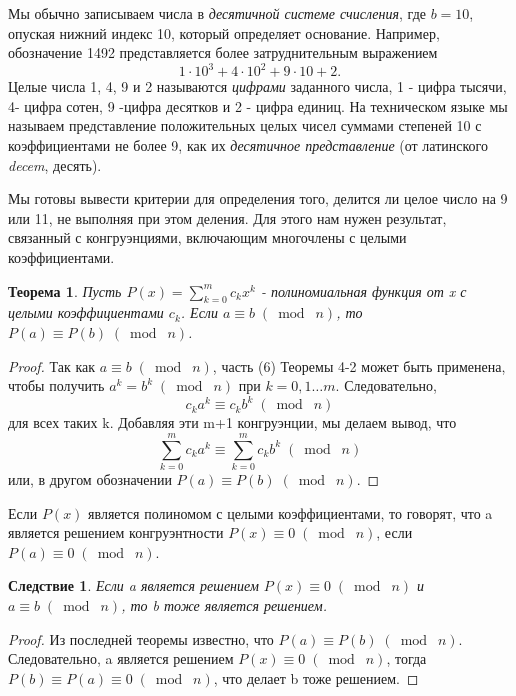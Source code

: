 \documentclass[11pt]{article}
\newtheorem{theorem}{Теорема}
\newtheorem{corollary}{Следствие}
\begin{document}
 Мы обычно записываем числа в {\it десятичной системе счисления}, где $ b=10 $, опуская нижний индекс 10, который определяет основание. Например, обозначение 1492 представляется более затруднительным выражением $$1\cdot10^{3}+4\cdot10^{2}+9\cdot10+2.  $$ Целые числа  1, 4, 9 и 2 называются {\it цифрами} заданного числа, 1 - цифра тысячи, 4- цифра сотен, 9 -цифра десятков и 2 - цифра единиц. На техническом языке мы называем представление положительных целых чисел суммами степеней 10 с коэффициентами не более 9, как их {\it десятичное представление} (от латинского {\it decem}, десять).
 
 Мы готовы вывести критерии для определения того, делится ли целое число на 9 или 11, не выполняя при этом деления. Для этого нам нужен результат, связанный с конгруэнциями, включающим многочлены с целыми коэффициентами.

\begin{theorem}
Пусть $P(x)=\sum_{k=0}^mc_{k}x^{k} $ - полиномиальная функция от  x  с целыми коэффициентами $ c_{k} $. Если  $a \equiv b \;(\bmod\; n)$, то $P(a) \equiv P(b) \;(\bmod\; n)$.
\end{theorem}

\begin{proof}
Так как $ a \equiv b \;(\bmod\; n) $, часть (6) Теоремы 4-2 может быть применена, чтобы получить $a^{k}=b^{k}\;(\bmod\; n)$ при $k=0,1\ldots m$. Следовательно, $$ c_{k}a^{k}\equiv c_{k}b^{k}\;(\bmod\; n) $$ для всех таких k. Добавляя эти m+1 конгруэнции, мы делаем вывод, что $$  \sum \limits_{k=0}^{m}c_{k}a^{k} \equiv \sum\limits_{k=0}^{m}c_{k}b^{k}\;(\bmod\; n) $$ или, в другом обозначении $P(a) \equiv P(b) \;(\bmod\; n)$.
\end{proof}

Если $P(x)$ является полиномом с целыми коэффициентами, то говорят, что a является решением конгруэнтности $ P(x)\equiv 0 \;(\bmod\; n) $, если $ P(a)\equiv 0 \;(\bmod\; n) $.

\begin{corollary}
Если a является решением $ P(x)\equiv 0 \;(\bmod\; n) $ и $a \equiv b \;(\bmod\; n)$, то b тоже является решением.	
\end{corollary}

\begin{proof}
Из последней теоремы известно, что $P(a) \equiv P(b) \;(\bmod\; n)$. Следовательно, a является решением $ P(x)\equiv 0 \;(\bmod\; n) $, тогда $ P(b)\equiv P(a) \equiv 0 \;(\bmod\; n)$, что делает b тоже решением.
\end{proof}
\end{document}
